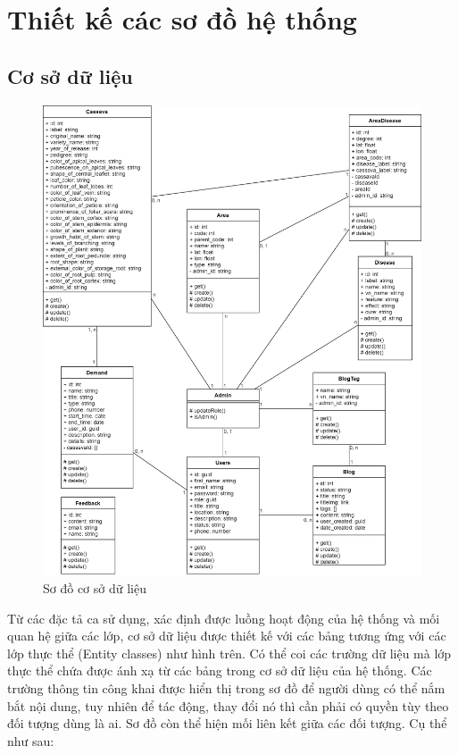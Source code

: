 \documentclass[./../main.tex]{subfiles}
\begin{document}
\section{Thiết kế các sơ đồ hệ thống}
\subsection{Cơ sở dữ liệu}
\begin{figure}[H]
	\centering
	\includegraphics[width=0.9\linewidth]{./img/db.png}
    \caption{Sơ đồ cơ sở dữ liệu}
\end{figure}
Từ các đặc tả ca sử dụng, xác định được luồng hoạt động của hệ thống và mối quan hệ giữa các lớp, cơ sở dữ liệu được thiết kế với các bảng tương ứng với các lớp thực thể (Entity classes) như hình trên. Có thể coi các trường dữ liệu mà lớp thực thể chứa được ánh xạ từ các bảng trong cơ sở dữ liệu của hệ thống. Các trường thông tin công khai được hiển thị trong sơ đồ để người dùng có thể nắm bắt nội dung, tuy nhiên để tác động, thay đổi nó thì cần phải có quyền tùy theo đối tượng dùng là ai. Sơ đồ còn thể hiện mối liên kết giữa các đối tượng. Cụ thể như sau:
\end{document}
